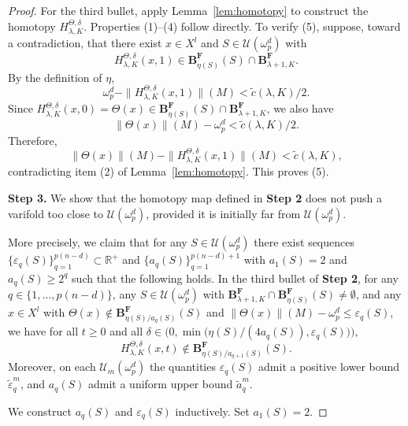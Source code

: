 \documentclass[10pt,a4paper]{amsart}
\begin{document}
\begin{proof}
For the third bullet, apply Lemma~\ref{lem:homotopy} to construct the homotopy \(H^{\Theta,\delta}_{\lambda,K}\). Properties (1)–(4) follow directly. To verify (5), suppose, toward a contradiction, that there exist \(x\in X^l\) and \(S\in\mathcal{U}(\omega^d_p)\) with
\[
H^{\Theta,\delta}_{\lambda,K}(x,1)\in \mathbf{B}^\mathbf{F}_{\eta(S)}(S)\cap \mathbf{B}^\mathbf{F}_{\lambda+1,K}.
\]
By the definition of \(\eta\),
\[
\omega^d_p-\|H^{\Theta,\delta}_{\lambda,K}(x,1)\|(M)<\tilde c(\lambda,K)/2.
\]
Since \(H^{\Theta,\delta}_{\lambda,K}(x,0)=\Theta(x)\in \mathbf{B}^\mathbf{F}_{\eta(S)}(S)\cap \mathbf{B}^\mathbf{F}_{\lambda+1,K}\), we also have
\[
\|\Theta(x)\|(M)-\omega^d_p<\tilde c(\lambda,K)/2.
\]
Therefore,
\[
\|\Theta(x)\|(M)-\|H^{\Theta,\delta}_{\lambda,K}(x,1)\|(M)<\tilde c(\lambda,K),
\]
contradicting item (2) of Lemma~\ref{lem:homotopy}. This proves (5).

\textbf{Step 3.} We show that the homotopy map defined in \textbf{Step 2} does not push a varifold too close to $\mathcal{U}(\omega^d_p)$, provided it is initially far from $\mathcal{U}(\omega^d_p)$.

More precisely, we claim that for any $S\in\mathcal{U}(\omega^d_p)$ there exist sequences $\{\varepsilon_q(S)\}_{q=1}^{p(n-d)}\subset\mathbb{R}^+$ and $\{a_q(S)\}_{q=1}^{p(n-d)+1}$ with $a_1(S)=2$ and $a_q(S)\ge 2^q$ such that the following holds. In the third bullet of \textbf{Step 2}, for any $q\in\{1,\dots,p(n-d)\}$, any $S\in\mathcal{U}(\omega^d_p)$ with $\mathbf{B}^{\mathbf F}_{\lambda+1,K}\cap \mathbf{B}^{\mathbf F}_{\eta(S)}(S)\neq\emptyset$, and any $x\in X^l$ with $\Theta(x)\notin \mathbf{B}^{\mathbf F}_{\eta(S)/a_q(S)}(S)$ and $\|\Theta(x)\|(M)-\omega^d_p\le \varepsilon_q(S)$, we have for all $t\ge0$ and all $\delta\in\bigl(0,\min\bigl(\eta(S)/(4a_q(S)),\varepsilon_q(S)\bigr)\bigr)$,
\[
    H^{\Theta,\delta}_{\lambda,K}(x,t)\notin \mathbf{B}^{\mathbf F}_{\eta(S)/a_{q+1}(S)}(S).
\]
Moreover, on each $\mathcal{U}_m(\omega^d_p)$ the quantities $\varepsilon_q(S)$ admit a positive lower bound $\tilde\varepsilon^m_q$, and $a_q(S)$ admit a uniform upper bound $\tilde a^m_q$.

We construct $a_q(S)$ and $\varepsilon_q(S)$ inductively. Set $a_1(S)=2$.


\end{proof}
\end{document}
